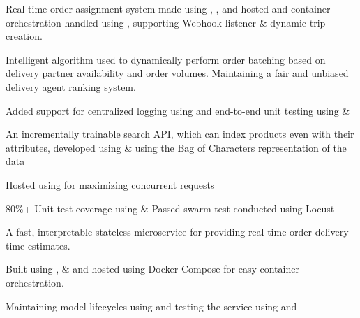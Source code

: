 \vspace{\topsep} %


 \textbullet{}  \textbullet{}  \textbullet{}  \textbullet{}  

\begin{tightemize}
\item Real-time order assignment system made using , , and hosted and container orchestration handled using , supporting Webhook listener \& dynamic trip creation.
\item Intelligent algorithm used to dynamically perform order batching based on delivery partner availability and order volumes. Maintaining a fair and unbiased delivery agent ranking system.
\item Added support for centralized logging using  and end-to-end unit testing using  \& 
\end{tightemize}


 \textbullet{}  \textbullet{}  \textbullet{} 

\begin{tightemize}
\item An incrementally trainable search API, which can index products even with their attributes, developed using  \&  using the Bag of Characters representation of the data
\item Hosted using  for maximizing concurrent requests
\item 80\%+ Unit test coverage using  \& Passed swarm test conducted using Locust
\end{tightemize}


 \textbullet{}  \textbullet{}  \textbullet{}  \textbullet{} 

\begin{tightemize}
\item A fast, interpretable stateless microservice for providing real-time order delivery time estimates.
\item Built using ,  \&  and hosted using Docker Compose for easy container orchestration.
\item Maintaining model lifecycles using  and testing the service using  and 
\end{tightemize}
